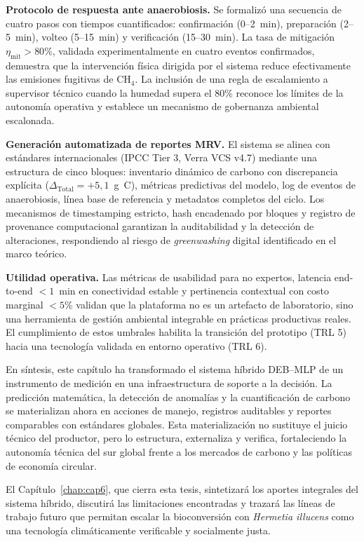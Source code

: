 \textbf{Protocolo de respuesta ante anaerobiosis.} Se formalizó una secuencia de cuatro pasos con tiempos cuantificados: confirmación (0--2~min), preparación (2--5~min), volteo (5--15~min) y verificación (15--30~min). La tasa de mitigación $\eta_{\mathrm{mit}} > 80$\%, validada experimentalmente en cuatro eventos confirmados, demuestra que la intervención física dirigida por el sistema reduce efectivamente las emisiones fugitivas de CH$_4$. La inclusión de una regla de escalamiento a supervisor técnico cuando la humedad supera el 80\% reconoce los límites de la autonomía operativa y establece un mecanismo de gobernanza ambiental escalonada.

\textbf{Generación automatizada de reportes MRV.} El sistema se alinea con estándares internacionales (IPCC Tier 3, Verra VCS v4.7) mediante una estructura de cinco bloques: inventario dinámico de carbono con discrepancia explícita ($\Delta_{\mathrm{Total}} = +5{,}1$~g~C), métricas predictivas del modelo, log de eventos de anaerobiosis, línea base de referencia y metadatos completos del ciclo. Los mecanismos de timestamping estricto, hash encadenado por bloques y registro de provenance computacional garantizan la auditabilidad y la detección de alteraciones, respondiendo al riesgo de \emph{greenwashing} digital identificado en el marco teórico.

\textbf{Utilidad operativa.} Las métricas de usabilidad para no expertos, latencia end-to-end $< 1$~min en conectividad estable y pertinencia contextual con costo marginal $< 5$\% validan que la plataforma no es un artefacto de laboratorio, sino una herramienta de gestión ambiental integrable en prácticas productivas reales. El cumplimiento de estos umbrales habilita la transición del prototipo (TRL 5) hacia una tecnología validada en entorno operativo (TRL 6).

En síntesis, este capítulo ha transformado el sistema híbrido DEB--MLP de un instrumento de medición en una infraestructura de soporte a la decisión. La predicción matemática, la detección de anomalías y la cuantificación de carbono se materializan ahora en acciones de manejo, registros auditables y reportes comparables con estándares globales. Esta materialización no sustituye el juicio técnico del productor, pero lo estructura, externaliza y verifica, fortaleciendo la autonomía técnica del sur global frente a los mercados de carbono y las políticas de economía circular.

El Capítulo~\ref{chap:cap6}, que cierra esta tesis, sintetizará los aportes integrales del sistema híbrido, discutirá las limitaciones encontradas y trazará las líneas de trabajo futuro que permitan escalar la bioconversión con \emph{Hermetia illucens} como una tecnología climáticamente verificable y socialmente justa.
